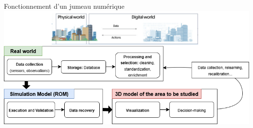 \documentclass{beamer}
\begin{document}
\begin{frame}{Fonctionnement d'un jumeau numérique} %
    \hspace*{-0.5cm}
    \includegraphics[width=1.1\textwidth]{images/pipeline.png} \\
\end{frame}
\end{document}
